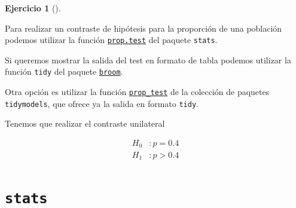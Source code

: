 \documentclass[
  a4paper,
]{scrreport}
\newenvironment{Shaded}{\begin{snugshade}}{\end{snugshade}}
\newcommand{\AttributeTok}[1]{\textcolor[rgb]{0.40,0.45,0.13}{#1}}
\newcommand{\FloatTok}[1]{\textcolor[rgb]{0.68,0.00,0.00}{#1}}
\newcommand{\FunctionTok}[1]{\textcolor[rgb]{0.28,0.35,0.67}{#1}}
\newcommand{\NormalTok}[1]{\textcolor[rgb]{0.00,0.23,0.31}{#1}}
\newcommand{\OtherTok}[1]{\textcolor[rgb]{0.00,0.23,0.31}{#1}}
\newcommand{\SpecialCharTok}[1]{\textcolor[rgb]{0.37,0.37,0.37}{#1}}
\newcommand{\StringTok}[1]{\textcolor[rgb]{0.13,0.47,0.30}{#1}}
\theoremstyle{definition}
\newtheorem{exercise}{Ejercicio}[chapter]
\theoremstyle{remark}
\begin{document}
\begin{exercise}[]
\begin{enumerate}
\begin{tcolorbox}
  Para realizar un contraste de hipótesis para la proporción de una
  población podemos utilizar la función
  \href{https://www.rdocumentation.org/packages/stats/versions/3.6.2/topics/prop.test}{\texttt{prop.test}}
  del paquete \texttt{stats}.

  Si queremos mostrar la salida del test en formato de tabla podemos
  utilizar la función \texttt{tidy} del paquete
  \href{https://broom.tidymodels.org/index.html}{\texttt{broom}}.

  Otra opción es utilizar la función
  \href{https://infer.tidymodels.org/reference/prop_test.html}{\texttt{prop\_test}}
  de la colección de paquetes \texttt{tidymodels}, que ofrece ya la
  salida en formato \texttt{tidy}.

  \end{tcolorbox}

  \begin{tcolorbox}[enhanced jigsaw, colframe=quarto-callout-tip-color-frame, toprule=.15mm, bottomtitle=1mm, breakable, opacitybacktitle=0.6, toptitle=1mm, colback=white, bottomrule=.15mm, title=\textcolor{quarto-callout-tip-color}{\faLightbulb}\hspace{0.5em}{Solución}, arc=.35mm, left=2mm, titlerule=0mm, rightrule=.15mm, coltitle=black, leftrule=.75mm, opacityback=0, colbacktitle=quarto-callout-tip-color!10!white]

  Tenemos que realizar el contraste unilateral

  \begin{align*}
  H_0 &: p = 0.4\\
  H_1 &: p > 0.4 
  \end{align*}

  \section{\texorpdfstring{\texttt{stats}}{stats}}

\begin{Shaded}
\end{Shaded}


\end{tcolorbox}
\end{enumerate}
\end{exercise}
\end{document}
